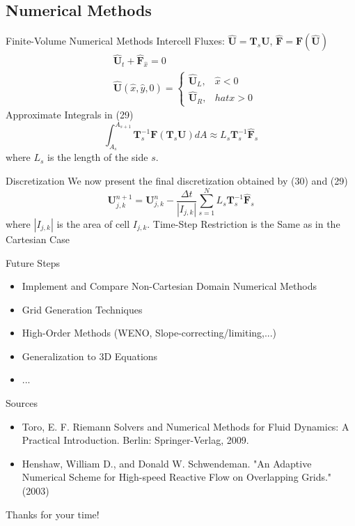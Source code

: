 \documentclass{beamer}
\newcommand{\mbf}{\mathbf}
\newcommand{\bq}{\begin{equation}}
\newcommand{\eq}{\end{equation}}
\begin{document}
\subsection{Numerical Methods}
\begin{frame}{Finite-Volume Numerical Methods}
Intercell Fluxes: $\hat{\mbf{U}}=\mbf{T}_s\mbf{U}$, $\hat{\mbf{F}}=\mbf{F}(\hat{\mbf{U}})$
\bq \begin{split} &\hat{\mbf{U}}_t+\hat{\mbf{F}}_{\hat{x}}=0\\
&\hat{\mbf{U}}(\hat{x},\hat{y},0)=\left\{\begin{array}{cc}\hat{\mbf{U}}_L,&\hat{x}<0\\ \hat{\mbf{U}}_R,&hat{x}>0\end{array}\right.\end{split}\eq
Approximate Integrals in (29)
\bq \int_{A_s}^{A_{s+1}}\mbf{T}_s^{-1}\mbf{F}(\mbf{T}_s\mbf{U})dA\approx L_s\mbf{T}_s^{-1}\hat{\mbf{F}}_s\eq
where $L_s$ is the length of the side $s$.
\end{frame}

\begin{frame}{Discretization}
We now present the final discretization obtained by (30) and (29)
\bq \mbf{U}_{j,k}^{n+1}=\mbf{U}_{j,k}^n-\frac{\Delta t}{|I_{j,k}|}\sum_{s=1}^N L_s\mbf{T}_s^{-1}\hat{\mbf{F}}_s\eq
where $|I_{j,k}|$ is the area of cell $I_{j,k}$. 
Time-Step Restriction is the Same as in the Cartesian Case
\end{frame}

\begin{frame}{Future Steps}
\begin{itemize}
\item Implement and Compare Non-Cartesian Domain Numerical Methods
\item Grid Generation Techniques
\item High-Order Methods (WENO, Slope-correcting/limiting,...)
\item Generalization to 3D Equations
\item ...
\end{itemize}
\end{frame}

\begin{frame}{Sources}
\begin{itemize}
\item Toro, E. F. Riemann Solvers and Numerical Methods for Fluid Dynamics: A Practical Introduction. Berlin: Springer-Verlag, 2009. 
\item Henshaw, William D., and Donald W. Schwendeman. "An Adaptive Numerical Scheme for High-speed Reactive Flow on Overlapping Grids." (2003)
\end{itemize}
\end{frame}

\begin{frame}
Thanks for your time!
\end{frame}
\end{document}
